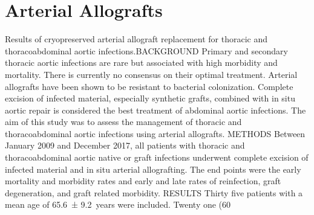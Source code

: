 \documentclass{qqtarticle}
\begin{document}
    \section{Arterial Allografts}
        Results of cryopreserved arterial allograft replacement for thoracic and thoracoabdominal aortic infections.BACKGROUND  Primary and secondary thoracic aortic infections are rare but associated with high morbidity and mortality. There is currently no consensus on their optimal treatment. Arterial allografts have been shown to be resistant to bacterial colonization. Complete excision of infected material, especially synthetic grafts, combined with in situ aortic repair is considered the best treatment of abdominal aortic infections. The aim of this study was to assess the management of thoracic and thoracoabdominal aortic infections using arterial allografts. METHODS  Between January 2009 and December 2017, all patients with thoracic and thoracoabdominal aortic native or graft infections underwent complete excision of infected material and in situ arterial allografting. The end points were the early mortality and morbidity rates and early and late rates of reinfection, graft degeneration, and graft related morbidity. RESULTS  Thirty five patients with a mean age of 65.6 ± 9.2 years were included. Twenty one (60%
\end{document}
